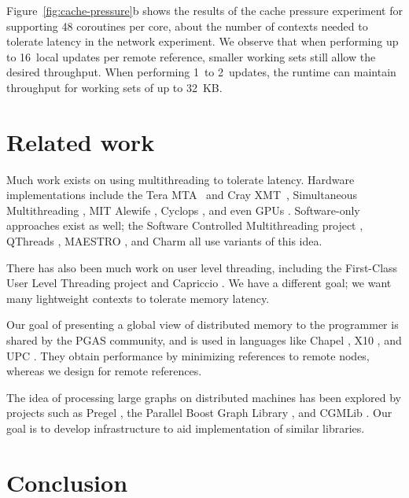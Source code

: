 \documentclass[10pt,nocopyrightspace]{sigplanconf}
\newcommand{\mrps}[1]{\unit[#1]{Mref/s}}
\begin{document}
Figure~\ref{fig:cache-pressure}b shows the results of the cache
pressure experiment for supporting 48 coroutines per core, about the
number of contexts needed to tolerate latency in the network
experiment. We observe that when performing up to 16~local updates per
remote reference, smaller working sets still allow the desired
throughput. When performing 1~to 2~updates, the runtime can maintain
throughput for working sets of up to 32~KB.



\section{Related work}
\label{sec:related}


Much work exists on using multithreading to tolerate latency. Hardware
implementations include the Tera {\small MTA}~\cite{tera} and Cray
{\small XMT}~\cite{feo-xmt}, Simultaneous Multithreading \cite{tullsen-smt},
MIT Alewife \cite{agarwal-alewife}, Cyclops \cite{almasi-cyclops}, and
even GPUs \cite{gpus}. Software-only approaches exist as well; the
Software Controlled Multithreading project \cite{mowry-scm}, QThreads
\cite{qthreads}, MAESTRO \cite{maestro}, and Charm \cite{charm} all
use variants of this idea.

There has also been much work on user level threading, including the First-Class
User Level Threading project \cite{ult} and Capriccio \cite{capriccio}. We have a
different goal; we want many lightweight contexts to tolerate memory
latency.

Our goal of presenting a global view of distributed memory to the
programmer is shared by the PGAS community, and is used in languages
like Chapel \cite{chapel}, X10 \cite{X10}, and UPC \cite{upc}. They
obtain performance by minimizing references to remote nodes, whereas we
design for remote references.

The idea of processing large graphs on distributed machines has been
explored by projects such as Pregel \cite{pregel}, the Parallel Boost
Graph Library \cite{parallelbgl}, and CGMLib \cite{cgmlib}. Our goal
is to develop infrastructure to aid implementation of similar
libraries.

\section{Conclusion}
\label{sec:conclusion}
\end{document}
